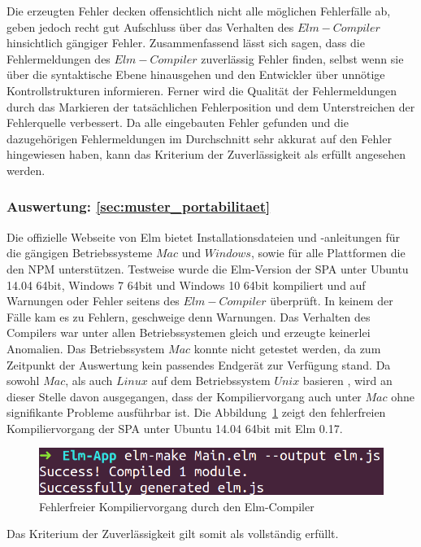 Die erzeugten Fehler decken offensichtlich nicht alle möglichen Fehlerfälle ab, geben jedoch recht gut Aufschluss über das Verhalten des $Elm-Compiler$ hinsichtlich gängiger Fehler. Zusammenfassend lässt sich sagen, dass die Fehlermeldungen des $Elm-Compiler$ zuverlässig Fehler finden, selbst wenn sie über die syntaktische Ebene hinausgehen und den Entwickler über unnötige Kontrollstrukturen informieren. Ferner wird die Qualität der Fehlermeldungen durch das Markieren der tatsächlichen Fehlerposition und dem Unterstreichen der Fehlerquelle verbessert.
Da alle eingebauten Fehler gefunden und die dazugehörigen Fehlermeldungen im Durchschnitt sehr akkurat auf den Fehler hingewiesen haben, kann das Kriterium der Zuverlässigkeit als erfüllt angesehen werden.


\subsubsection{Auswertung: \ref{sec:muster_portabilitaet} }
Die offizielle Webseite von Elm bietet Installationsdateien und -anleitungen für die gängigen Betriebssysteme $Mac$ und $Windows$, sowie für alle Plattformen die den \ac{NPM} unterstützen. Testweise wurde die Elm-Version der \ac{SPA} unter Ubuntu 14.04 64bit, Windows 7 64bit und Windows 10 64bit kompiliert und auf Warnungen oder Fehler seitens des $Elm-Compiler$ überprüft. In keinem der Fälle kam es zu Fehlern, geschweige denn Warnungen. Das Verhalten des Compilers war unter allen Betriebssystemen gleich und erzeugte keinerlei Anomalien. Das Betriebssystem $Mac$ konnte nicht getestet werden, da zum Zeitpunkt der Auswertung kein passendes Endgerät zur Verfügung stand. Da sowohl $Mac$, als auch $Linux$ auf dem Betriebssystem $Unix$ basieren \cite[Vgl.]{itwissen}, wird an dieser Stelle davon ausgegangen, dass der Kompiliervorgang auch unter $Mac$ ohne signifikante Probleme ausführbar ist. Die Abbildung~\ref{fig:elm-compile} zeigt den fehlerfreien Kompiliervorgang der \ac{SPA} unter Ubuntu 14.04 64bit mit Elm 0.17.
\begin{figure}[h]
\centering
\includegraphics[scale=0.5]{img/elm-compile.png}
\caption{Fehlerfreier Kompiliervorgang durch den Elm-Compiler}\label{fig:elm-compile}
\end{figure}
Das Kriterium der Zuverlässigkeit gilt somit als vollständig erfüllt.


